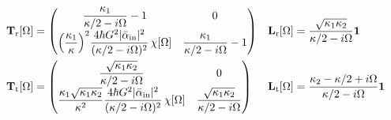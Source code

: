 \begin{equation}
  \begin{alignedat}{3}
    \mathbf{T}_{\mathrm{r}}[\Omega] &=\begin{pmatrix}
  \dfrac{\kappa_1}{\kappa/2-i\Omega}  -1  & 0 \\
  \Bigl(\dfrac{\kappa_{\mathrm{1}}}{\kappa}\Bigr)^2 \dfrac{4\hbar G^2|\bar \alpha_{\textrm{in}}|^2}{(\kappa/2 - i\Omega)^2}  \,  \chi[\Omega]  &  \dfrac{\kappa_1}{\kappa/2-i\Omega}  -1
\end{pmatrix} \quad
 & \mathbf{L}_{\mathrm{r}}[\Omega] &= \dfrac{\sqrt{\kappa_1 \kappa_{2}}}{\kappa/2-i\Omega} \mathbf{1} \\
    \mathbf{T}_{\mathrm{t}}[\Omega] &=  \begin{pmatrix}
   \dfrac{ \sqrt{\kappa_1 \kappa_2}}{\kappa/2-i\Omega}   & 0 \\
  \dfrac{\kappa_{\mathrm{1}}\sqrt{\kappa_1\kappa_2}}{\kappa^2} \dfrac{4\hbar G^2|\bar \alpha_{\textrm{in}}|^2}{(\kappa/2 - i\Omega)^2}  \,  \chi[\Omega]  &   \dfrac{ \sqrt{\kappa_1 \kappa_2}}{\kappa/2-i\Omega}  
\end{pmatrix} \quad 
& \mathbf{L}_{\mathrm{t}}[\Omega]&= \dfrac{\kappa_2-\kappa/2+i\Omega}{\kappa/2-i\Omega} \mathbf{1} \
  \end{alignedat}
\end{equation}



